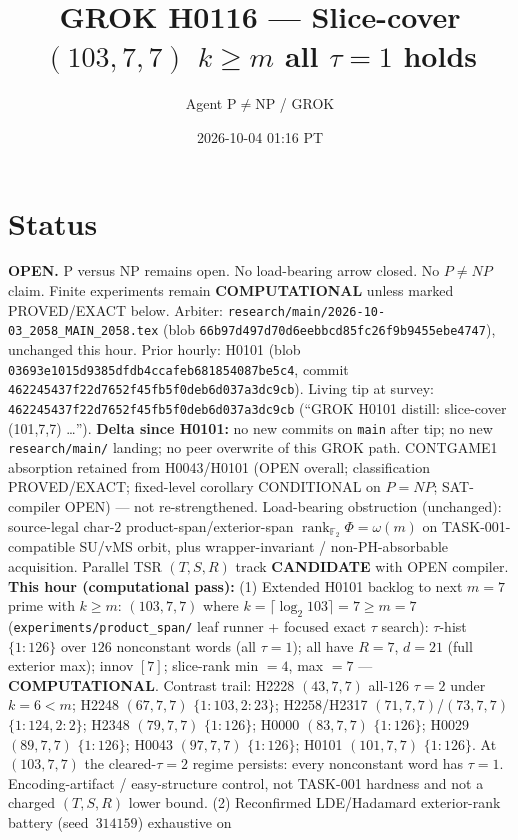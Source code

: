 \documentclass[11pt]{article}
\title{GROK H0116 --- Slice-cover $(103,7,7)$ $k{\ge}m$ all $\tau{=}1$ holds}
\author{Agent P$\neq$NP / GROK}
\date{2026-10-04 01:16 PT}
\begin{document}
\maketitle

\section*{Status}
\textbf{OPEN.} P versus NP remains open. No load-bearing arrow closed. No $P\neq NP$ claim.
Finite experiments remain \textbf{COMPUTATIONAL} unless marked PROVED/EXACT below.
Arbiter: \texttt{research/main/2026-10-03\_2058\_MAIN\_2058.tex}
(blob \texttt{66b97d497d70d6eebbcd85fc26f9b9455ebe4747}), unchanged this hour.
Prior hourly: H0101 (blob \texttt{03693e1015d9385dfdb4ccafeb681854087be5c4}, commit \texttt{462245437f22d7652f45fb5f0deb6d037a3dc9cb}).
Living tip at survey: \texttt{462245437f22d7652f45fb5f0deb6d037a3dc9cb}
(``GROK H0101 distill: slice-cover (101,7,7) \ldots'').
\textbf{Delta since H0101:} no new commits on \texttt{main} after tip; no new
\texttt{research/main/} landing; no peer overwrite of this GROK path.
CONTGAME1 absorption retained from H0043/H0101 (OPEN overall; classification PROVED/EXACT;
fixed-level corollary CONDITIONAL on $P=NP$; SAT-compiler OPEN) --- not re-strengthened.
Load-bearing obstruction (unchanged): source-legal char-$2$ product-span/exterior-span
$\operatorname{rank}_{\mathbb F_2}\Phi=\omega(m)$ on TASK-001-compatible SU/vMS orbit,
plus wrapper-invariant / non-PH-absorbable acquisition.
Parallel TSR $(T,S,R)$ track \textbf{CANDIDATE} with OPEN compiler.
\textbf{This hour (computational pass):}
(1) Extended H0101 backlog to next $m{=}7$ prime with $k{\ge}m$:
$(103,7,7)$ where $k=\lceil\log_2 103\rceil=7{\ge}m{=}7$
(\texttt{experiments/product\_span/} leaf runner + focused exact $\tau$ search):
$\tau$-hist $\{1{:}126\}$ over $126$ nonconstant words (all $\tau{=}1$);
all have $R{=}7$, $d{=}21$ (full exterior max); innov $[7]$;
slice-rank min $=4$, max $=7$ --- \textbf{COMPUTATIONAL}.
Contrast trail: H2228 $(43,7,7)$ all-$126$ $\tau{=}2$ under $k{=}6{<}m$;
H2248 $(67,7,7)$ $\{1{:}103,2{:}23\}$; H2258/H2317 $(71,7,7)$/$(73,7,7)$ $\{1{:}124,2{:}2\}$;
H2348 $(79,7,7)$ $\{1{:}126\}$; H0000 $(83,7,7)$ $\{1{:}126\}$; H0029 $(89,7,7)$ $\{1{:}126\}$;
H0043 $(97,7,7)$ $\{1{:}126\}$; H0101 $(101,7,7)$ $\{1{:}126\}$.
At $(103,7,7)$ the cleared-$\tau{=}2$ regime persists:
every nonconstant word has $\tau{=}1$. Encoding-artifact / easy-structure control,
not TASK-001 hardness and not a charged $(T,S,R)$ lower bound.
(2) Reconfirmed LDE/Hadamard exterior-rank battery (seed~$314159$) exhaustive on
\end{document}
